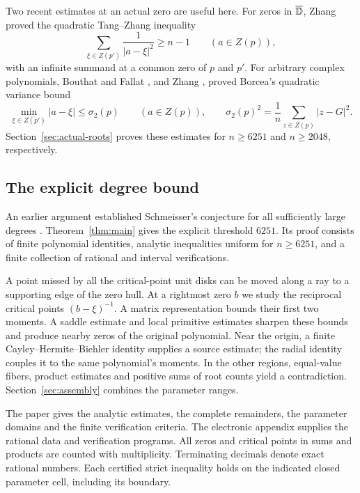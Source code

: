 Two recent estimates at an actual zero are useful here.
For zeros in $\overline{\mathbb D}$, Zhang \cite{ZhangQuadratic} proved the
quadratic Tang--Zhang inequality
\[
 \sum_{\xi\in Z(p')}\frac1{|a-\xi|^2}\ge n-1
       \qquad(a\in Z(p)),
\]
with an infinite summand at a common zero of $p$ and $p'$.
For arbitrary complex polynomials, Bouthat and Fallat
\cite{BouthatFallat}, and Zhang
\cite{ZhangVariance}, proved Borcea's quadratic variance bound
\[
 \min_{\xi\in Z(p')}|a-\xi|\le\sigma_2(p)
       \qquad(a\in Z(p)),\qquad
 \sigma_2(p)^2=\frac1n\sum_{z\in Z(p)}|z-G|^2.
\]
Section~\ref{sec:actual-roots} proves these estimates for
$n\ge6251$ and $n\ge2048$, respectively.

\subsection{The explicit degree bound}

An earlier argument established Schmeisser's conjecture for all
sufficiently large degrees \cite{TangQualitative}.
Theorem~\ref{thm:main} gives the explicit threshold $6251$.
Its proof consists of finite polynomial identities, analytic
inequalities uniform for $n\ge6251$, and a finite collection of
rational and interval verifications.

A point missed by all the critical-point unit disks can be moved
along a ray to a supporting edge of the zero hull. At a rightmost
zero $b$ we study the reciprocal critical points $(b-\xi)^{-1}$.
A matrix representation bounds their first two moments. A saddle
estimate and local primitive estimates sharpen these bounds and
produce nearby zeros of the original polynomial. Near the origin,
a finite Cayley--Hermite--Biehler identity supplies a source estimate;
the radial identity couples it to the same polynomial's moments.
In the other regions, equal-value fibers, product estimates and
positive sums of root counts yield a contradiction.
Section~\ref{sec:assembly} combines the parameter ranges.

The paper gives the analytic estimates, the complete remainders,
the parameter domains and the finite verification criteria.
The electronic appendix supplies the rational data and verification
programs. All zeros and critical points in sums and products are
counted with multiplicity. Terminating decimals denote exact rational
numbers. Each certified strict inequality holds on the indicated
closed parameter cell, including its boundary.
